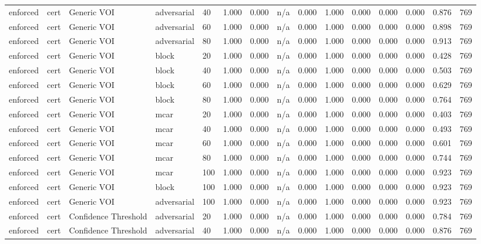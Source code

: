 \begin{table}[!ht]
{\begin{tabular}{lllllllllllllll}
enforced & cert & Generic VOI & adversarial & 40 & 1.000 & 0.000 & n/a & 0.000 & 1.000 & 0.000 & 0.000 & 0.000 & 0.876 & 769 \\
enforced & cert & Generic VOI & adversarial & 60 & 1.000 & 0.000 & n/a & 0.000 & 1.000 & 0.000 & 0.000 & 0.000 & 0.898 & 769 \\
enforced & cert & Generic VOI & adversarial & 80 & 1.000 & 0.000 & n/a & 0.000 & 1.000 & 0.000 & 0.000 & 0.000 & 0.913 & 769 \\
enforced & cert & Generic VOI & block & 20 & 1.000 & 0.000 & n/a & 0.000 & 1.000 & 0.000 & 0.000 & 0.000 & 0.428 & 769 \\
enforced & cert & Generic VOI & block & 40 & 1.000 & 0.000 & n/a & 0.000 & 1.000 & 0.000 & 0.000 & 0.000 & 0.503 & 769 \\
enforced & cert & Generic VOI & block & 60 & 1.000 & 0.000 & n/a & 0.000 & 1.000 & 0.000 & 0.000 & 0.000 & 0.629 & 769 \\
enforced & cert & Generic VOI & block & 80 & 1.000 & 0.000 & n/a & 0.000 & 1.000 & 0.000 & 0.000 & 0.000 & 0.764 & 769 \\
enforced & cert & Generic VOI & mcar & 20 & 1.000 & 0.000 & n/a & 0.000 & 1.000 & 0.000 & 0.000 & 0.000 & 0.403 & 769 \\
enforced & cert & Generic VOI & mcar & 40 & 1.000 & 0.000 & n/a & 0.000 & 1.000 & 0.000 & 0.000 & 0.000 & 0.493 & 769 \\
enforced & cert & Generic VOI & mcar & 60 & 1.000 & 0.000 & n/a & 0.000 & 1.000 & 0.000 & 0.000 & 0.000 & 0.601 & 769 \\
enforced & cert & Generic VOI & mcar & 80 & 1.000 & 0.000 & n/a & 0.000 & 1.000 & 0.000 & 0.000 & 0.000 & 0.744 & 769 \\
enforced & cert & Generic VOI & mcar & 100 & 1.000 & 0.000 & n/a & 0.000 & 1.000 & 0.000 & 0.000 & 0.000 & 0.923 & 769 \\
enforced & cert & Generic VOI & block & 100 & 1.000 & 0.000 & n/a & 0.000 & 1.000 & 0.000 & 0.000 & 0.000 & 0.923 & 769 \\
enforced & cert & Generic VOI & adversarial & 100 & 1.000 & 0.000 & n/a & 0.000 & 1.000 & 0.000 & 0.000 & 0.000 & 0.923 & 769 \\
enforced & cert & Confidence Threshold & adversarial & 20 & 1.000 & 0.000 & n/a & 0.000 & 1.000 & 0.000 & 0.000 & 0.000 & 0.784 & 769 \\
enforced & cert & Confidence Threshold & adversarial & 40 & 1.000 & 0.000 & n/a & 0.000 & 1.000 & 0.000 & 0.000 & 0.000 & 0.876 & 769 \\

\end{tabular}}
\end{table}
